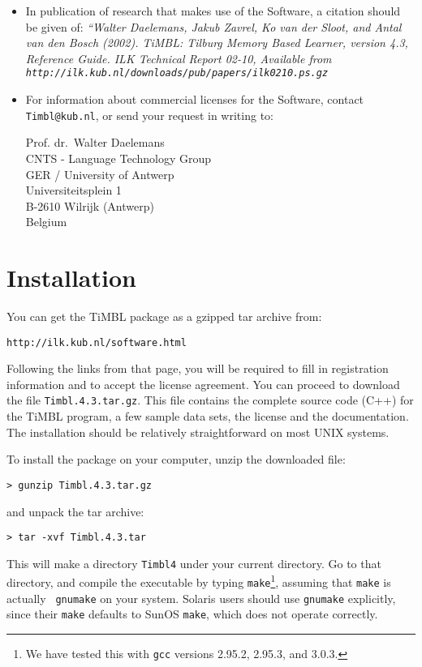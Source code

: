 \documentclass{report}
\begin{document}
\begin{itemize}
\item In publication of research that makes use of the Software, a
citation should be given of: {\em ``Walter Daelemans, Jakub Zavrel, Ko
van der Sloot, and Antal van den Bosch (2002). TiMBL: Tilburg Memory
Based Learner, version 4.3, Reference Guide. ILK Technical Report
02-10, Available from {\tt
http://ilk.kub.nl/downloads/pub/papers/ilk0210.ps.gz}}

\item For information about commercial licenses for the Software,
contact {\tt Timbl@kub.nl}, or send your request in writing to:

Prof. dr.~Walter Daelemans\\
CNTS - Language Technology Group\\
GER / University of Antwerp\\
Universiteitsplein 1\\
B-2610 Wilrijk (Antwerp)\\
Belgium

\end{itemize}

\pagestyle{headings}

\chapter{Installation}
\vspace{-1cm}
You can get the TiMBL package as a gzipped tar archive from:

{\tt http://ilk.kub.nl/software.html}

Following the links from that page, you will be required to fill in
registration information and to accept the license agreement. You can
proceed to download the file {\tt Timbl.4.3.tar.gz}. This file contains
the complete source code (C++) for the TiMBL program, a few sample
data sets, the license and the documentation. The installation should
be relatively straightforward on most UNIX systems.

To install the package on your computer, unzip the downloaded file:

{\tt > gunzip Timbl.4.3.tar.gz}

and unpack the tar archive:

{\tt > tar -xvf Timbl.4.3.tar}

This will make a directory {\tt Timbl4} under your current
directory. Go to that directory, and compile the executable by typing
{\tt make}\footnote{We have tested this with {\tt gcc} versions
2.95.2, 2.95.3, and 3.0.3.}, assuming that {\tt make} is actually {\tt
gnumake} on your system.  Solaris users should use {\tt gnumake}
explicitly, since their {\tt make} defaults to SunOS {\tt make}, which
does not operate correctly.
\end{document}
